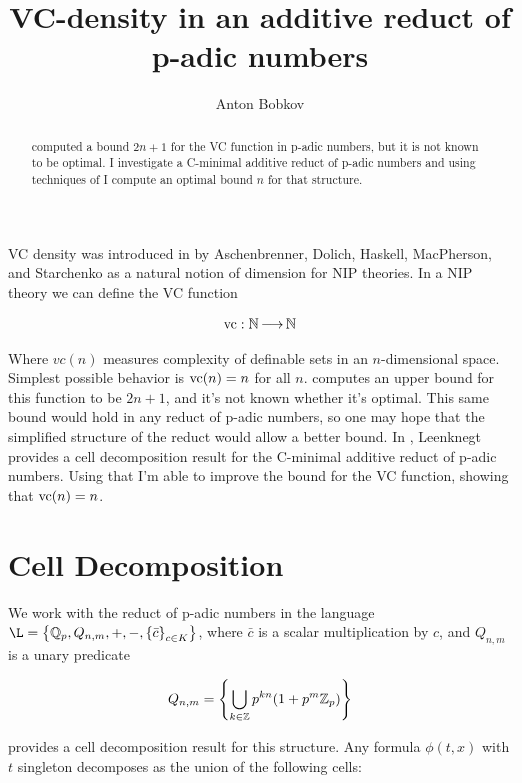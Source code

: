 \documentclass{amsart}
\title{VC-density in an additive reduct of p-adic numbers}
\author{Anton Bobkov}
\newcommand{\curly}[1]{\left\{#1\right\}}
\begin{document}
\begin{abstract}
	\cite{density} computed a bound $2n+1$ for the VC function in p-adic numbers, but it is not known to be optimal.
	I investigate a C-minimal additive reduct of p-adic numbers and using techniques of \cite{reduct} I compute an optimal bound $n$ for that structure.
\end{abstract}


\maketitle

VC density was introduced in \cite{density} by Aschenbrenner, Dolich, Haskell, MacPherson, and Starchenko as a natural notion of dimension for NIP theories.
In a NIP theory we can define the VC function

\begin{align*}
	\operatorname{vc} : \mathbb{N} \operatorname{\longrightarrow} \mathbb{N}
\end{align*}

Where $vc(n)$ measures complexity of definable sets in an $n$-dimensional space.
Simplest possible behavior is $\operatorname{vc}(n) = n$ for all $n$.
\cite{density} computes an upper bound for this function to be $2n+1$, and it's not known whether it's optimal.
This same bound would hold in any reduct of p-adic numbers, so one may hope that the simplified structure of the reduct would allow a better bound.
In \cite{reduct}, Leenknegt provides a cell decomposition result for the C-minimal additive reduct of p-adic numbers.
Using that I'm able to improve the bound for the VC function, showing that $\operatorname{vc}(n) = n$.


\section{Cell Decomposition}



We work with the reduct of p-adic numbers in the language $\L = \curly{\Q_p, Q_{n,m}, +, -, \curly{\bar c}_{c \in K} }$,
where $\bar c$ is a scalar multiplication by $c$, and $Q_{n,m}$ is a unary predicate

\begin{align*}
	Q_{n,m} = \curly{\bigcup_{k \in \Z} p^{kn} (1 + p^m\Z_p) }
\end{align*}

\cite{reduct} provides a cell decomposition result for this structure.
Any formula $\phi(t, x)$  with $t$  singleton decomposes as the union of the following cells:
\end{document}
